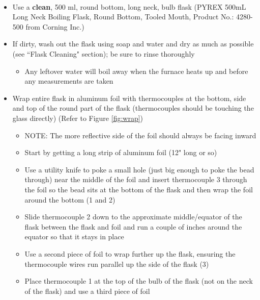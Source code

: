 \documentclass[letterpaper,11pt]{article}
\begin{document}
\begin{itemize}
\begin{itemize}
        \item Use a \textbf{clean}, 500 ml, round bottom, long neck, bulb flask 
            (PYREX\textsuperscript{\textcopyright} 500mL Long Neck Boiling 
            Flask, Round Bottom, Tooled Mouth, Product No.: 4280-500 from 
            Corning Inc.)
        \item If dirty, wash out the flask using soap and water and dry as much 
            as possible (see ``Flask Cleaning" section); be sure to rinse
            thoroughly
                \begin{itemize}
                \item Any leftover water will boil away when the furnace heats 
                up and before any measurements are taken
                \end{itemize}        
        \item Wrap entire flask in aluminum foil with thermocouples at the 
            bottom, side and top of the round part of the flask (thermocouples 
            should be touching the glass directly) (Refer to Figure 
            \ref{fig:wrap})
                \begin{itemize}
                \item NOTE: The more reflective side of the foil should always 
                    be facing inward
                \item Start by getting a long strip of aluminum foil (12" long 
                    or so)
                \item Use a utility knife to poke a small hole (just big enough 
                    to poke the bead through) near the middle of 
                    the foil and insert thermocouple 3 through the foil so the 
                    bead sits at the bottom of the flask and then wrap the foil 
                    around the bottom (1 and 2)
                \item Slide thermocouple 2 down to the approximate 
                    middle/equator of the flask between the flask and foil and run
                    a couple of inches around the equator so that it stays in place  
                \item Use a second piece of foil to wrap further up the flask, 
                    ensuring the thermocouple wires run parallel up the side of 
                    the flask (3)
                \item Place thermocouple 1 at the top of the bulb of the flask 
                    (not on the neck of the flask) and use a third piece of foil

\end{itemize}
\end{itemize}
\end{itemize}
\end{document}
